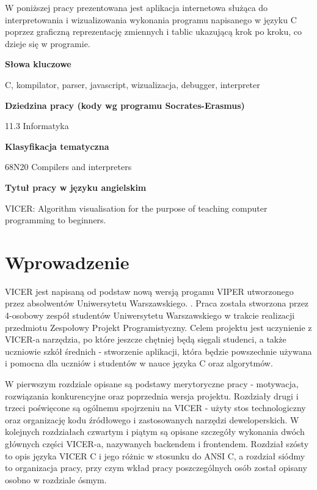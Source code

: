 \documentclass[a4paper,twoside,openright,11pt]{report}
\begin{document}
  \begin{titlepage}
  \null\nobreak\vfil
  \begin{center}%
    \bfseries\large \abstractname
  \end{center}
W poniższej pracy prezentowana jest aplikacja internetowa służąca do interpretowania i wizualizowania wykonania programu napisanego w języku C poprzez graficzną reprezentację zmiennych i tablic ukazującą krok po kroku, co dzieje się w programie.  \vspace*{26pt}%
  \begin{center}%
    \bfseries\large Słowa kluczowe
  \end{center}
  C, kompilator, parser, javascript, wizualizacja, debugger, interpreter
  \vspace*{26pt}%
  \begin{center}%
    \bfseries\large Dziedzina pracy (kody wg programu Socrates-Erasmus)
  \end{center}
   11.3 Informatyka
  \vspace*{26pt}%
  \begin{center}%
    \bfseries\large Klasyfikacja tematyczna
  \end{center}
   68N20 Compilers and interpreters
  \vspace*{26pt}%
  \begin{center}%
    \bfseries\large Tytuł pracy w języku angielskim
  \end{center}
  VICER: Algorithm visualisation for the purpose of teaching computer programming to beginners.
  \nobreak\vfil\null\cleardoublepage
  \end{titlepage}

  \tableofcontents

  \chapter{Wprowadzenie}
\par VICER jest napisaną od podstaw nową wersją progamu VIPER utworzonego przez absolwentów Uniwersytetu Warszawskiego. \cite{viper1}. Praca została stworzona przez 4-osobowy zespół studentów Uniwersytetu Warszawskiego w trakcie realizacji przedmiotu Zespołowy Projekt Programistyczny. Celem projektu jest uczynienie z VICER-a narzędzia, po które jeszcze chętniej będą sięgali studenci, a także uczniowie szkół średnich - stworzenie aplikacji, która będzie powszechnie używana i pomocna dla uczniów i studentów w nauce języka C oraz algorytmów. 
\par W pierwszym rozdziale opisane są podstawy merytoryczne pracy - motywacja, rozwiązania konkurencyjne oraz poprzednia wersja projektu. Rozdziały drugi i trzeci poświęcone są ogólnemu spojrzeniu na VICER - użyty stos technologiczny oraz organizację kodu źródłowego i zastosowanych narzędzi deweloperskich. W kolejnych rozdziałach czwartym i piątym są opisane szczegóły wykonania dwóch głównych części VICER-a, nazywanych backendem i frontendem. Rozdział szósty to opis języka VICER C i jego różnic w stosunku do ANSI C, a rozdział siódmy to organizacja pracy, przy czym wkład pracy poszczególnych osób został opisany osobno w rozdziale ósmym.
\end{document}

